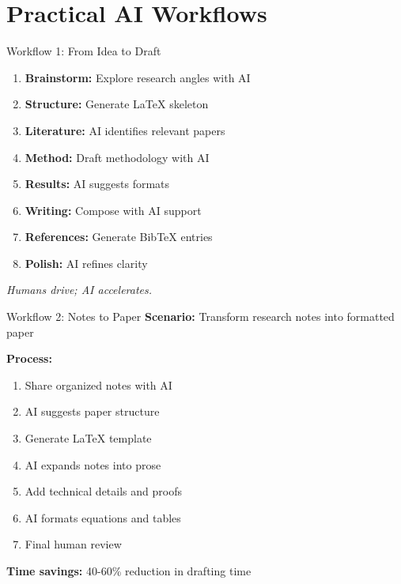 \documentclass[aspectratio=169]{beamer}
\begin{document}
	\section{Practical AI Workflows}
	
	\begin{frame}{Workflow 1: From Idea to Draft}
		\begin{enumerate}
			\item \textbf{Brainstorm:} Explore research angles with AI
			\item \textbf{Structure:} Generate LaTeX skeleton
			\item \textbf{Literature:} AI identifies relevant papers
			\item \textbf{Method:} Draft methodology with AI
			\item \textbf{Results:} AI suggests formats
			\item \textbf{Writing:} Compose with AI support
			\item \textbf{References:} Generate BibTeX entries
			\item \textbf{Polish:} AI refines clarity
		\end{enumerate}
		
		\vspace{0.5em}
		
		\textit{Humans drive; AI accelerates.}
	\end{frame}
	
	\begin{frame}{Workflow 2: Notes to Paper}
		\textbf{Scenario:} Transform research notes into formatted paper
		
		\vspace{0.5em}
		
		\textbf{Process:}
		\begin{enumerate}
			\item Share organized notes with AI
			\item AI suggests paper structure
			\item Generate LaTeX template
			\item AI expands notes into prose
			\item Add technical details and proofs
			\item AI formats equations and tables
			\item Final human review
		\end{enumerate}
		
		\vspace{0.5em}
		
		\textbf{Time savings:} 40-60\% reduction in drafting time
	\end{frame}
	
\end{document}
